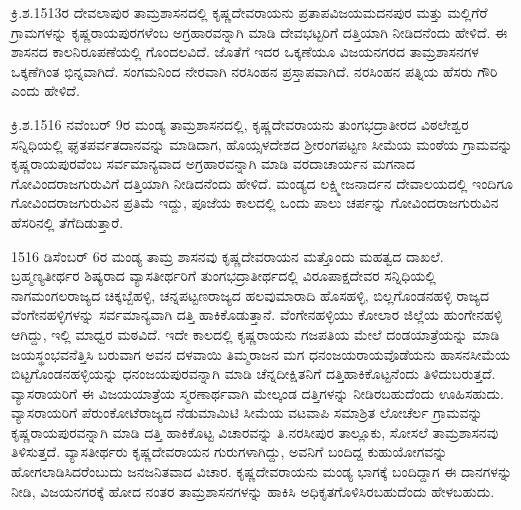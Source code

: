 ಕ್ರಿ.ಶ.1513ರ ದೇವಲಾಪುರ ತಾಮ್ರಶಾಸನದಲ್ಲಿ ಕೃಷ್ಣದೇವರಾಯನು ಪ್ರತಾಪವಿಜಯಮದನಪುರ ಮತ್ತು ಮಲ್ಲಿಗೆರೆ ಗ್ರಾಮಗಳನ್ನು ಕೃಷ್ಣರಾಯಪುರಗಳೆಂಬ ಅಗ್ರಹಾರವನ್ನಾಗಿ ಮಾಡಿ ದೇವಭಟ್ಟರಿಗೆ ದತ್ತಿಯಾಗಿ ನೀಡಿದನೆಂದು ಹೇಳಿದೆ. ಈ ಶಾಸನದ ಕಾಲನಿರೂಪಣೆಯಲ್ಲಿ ಗೊಂದಲವಿದೆ. ಜೊತೆಗೆ ಇದರ ಒಕ್ಕಣೆಯೂ ವಿಜಯನಗರದ ತಾಮ್ರಶಾಸನಗಳ ಒಕ್ಕಣೆಗಿಂತ ಭಿನ್ನವಾಗಿದೆ. ಸಂಗಮನಿಂದ ನೇರವಾಗಿ ನರಸಿಂಹನ ಪ್ರಸ್ತಾಪವಾಗಿದೆ. ನರಸಿಂಹನ ಪತ್ನಿಯ ಹೆಸರು ಗೌರಿ ಎಂದು ಹೇಳಿದೆ. 

ಕ್ರಿ.ಶ.1516 ನವೆಂಬರ್​ 9ರ ಮಂಡ್ಯ ತಾಮ್ರಶಾಸನದಲ್ಲಿ, ಕೃಷ್ಣದೇವರಾಯನು ತುಂಗಭದ್ರಾತೀರದ ವಿಠಲೇಶ್ವರ ಸನ್ನಿಧಿಯಲ್ಲಿ ಘೃತಪರ್ವತದಾನವನ್ನು ಮಾಡಿದಾಗ, ಹೊಯ್ಸಳದೇಶದ ಶ‍್ರೀರಂಗಪಟ್ಟಣ ಸೀಮೆಯ ಮಂಠೆಯ ಗ್ರಾಮವನ್ನು ಕೃಷ್ಣರಾಯಪುರವೆಂಬ ಸರ್ವಮಾನ್ಯವಾದ ಅಗ್ರಹಾರವನ್ನಾಗಿ ಮಾಡಿ ವರದಾಚಾರ್ಯನ ಮಗನಾದ ಗೋವಿಂದರಾಜಗುರುವಿಗೆ ದತ್ತಿಯಾಗಿ ನೀಡಿದನೆಂದು ಹೇಳಿದೆ. ಮಂಡ್ಯದ ಲಕ್ಷ್ಮೀಜನಾರ್ದನ ದೇವಾಲಯದಲ್ಲಿ ಇಂದಿಗೂ ಗೋವಿಂದರಾಜಗುರುವಿನ ಪ್ರತಿಮೆ ಇದ್ದು, ಪೂಜೆಯ ಕಾಲದಲ್ಲಿ ಒಂದು ಪಾಲು ಚರ್ಪನ್ನು ಗೋವಿಂದರಾಜಗುರುವಿನ ಹೆಸರಿನಲ್ಲಿ ತೆಗೆದಿಡುತ್ತಾರೆ.

1516 ಡಿಸೆಂಬರ್​ 6ರ ಮಂಡ್ಯ ತಾಮ್ರ ಶಾಸನವು ಕೃಷ್ಣದೇವರಾಯನ ಮತ್ತೊಂದು ಮಹತ್ವದ ದಾಖಲೆ. ಬ್ರಹ್ಮಣ್ಯತೀರ್ಥರ ಶಿಷ್ಯರಾದ ವ್ಯಾಸತೀರ್ಥರಿಗೆ ತುಂಗಭದ್ರಾತೀರ್ಥದಲ್ಲಿ ವಿರೂಪಾಕ್ಷದೇವರ ಸನ್ನಿಧಿಯಲ್ಲಿ ನಾಗಮಂಗಲರಾಜ್ಯದ ಚಿಕ್ಕಬ್ಬೆಹಳ್ಳಿ, ಚನ್ನಪಟ್ಟಣರಾಜ್ಯದ ಹಲವುಮಾರಾದಿ ಹೊಸಹಳ್ಳಿ, ಬಿಲ್ಲಗೊಂಡನಹಳ್ಳಿ ರಾಜ್ಯದ ವೆಂಗೇನಹಳ್ಳಿಗಳನ್ನು ಸರ್ವಮಾನ್ಯವಾಗಿ ದತ್ತಿ ಹಾಕಿಕೊಡುತ್ತಾನೆ. ವೆಂಗೇನಹಳ್ಳಿಯು ಕೋಲಾರ ಜಿಲ್ಲೆಯ ಹುಂಗೇನಹಳ್ಳಿ ಆಗಿದ್ದು, ಇಲ್ಲಿ ಮಾಧ್ವರ ಮಠವಿದೆ. ಇದೇ ಕಾಲದಲ್ಲಿ ಕೃಷ್ಣರಾಯನು ಗಜಪತಿಯ ಮೇಲೆ ದಂಡಯಾತ್ರೆಯನ್ನು ಮಾಡಿ ಜಯಸ್ಥಂಭವನೆತ್ತಿಸಿ ಬರುವಾಗ ಅವನ ದಳವಾಯಿ ತಿಮ್ಮರಾಜನ ಮಗ ಧನಂಜಯರಾಯವೊಡೆಯನು ಹಾಸನಸೀಮೆಯ ಬಿಟ್ಟಗೊಂಡನಹಳ್ಳಿಯನ್ನು ಧನಂಜಯಪುರವನ್ನಾಗಿ ಮಾಡಿ ಚೆನ್ನದೀಕ್ಷಿತನಿಗೆ ದತ್ತಿಹಾಕಿಕೊಟ್ಟನೆಂದು ತಿಳಿದುಬರುತ್ತದೆ. ವ್ಯಾಸರಾಯರಿಗೆ ಈ ವಿಜಯಯಾತ್ರೆಯ ಸ್ಮರಣಾರ್ಥವಾಗಿ ಮೇಲ್ಕಂಡ ದತ್ತಿಗಳನ್ನು ನೀಡಿರಬಹುದೆಂದು ಊಹಿಸಹುದು. ವ್ಯಾಸರಾಯರಿಗೆ ಪೆರುಂಕೋಟೆರಾಜ್ಯದ ನೆಡುಮಾಮಿಟಿ ಸೀಮೆಯ ವಟವಾಪಿ ಸಮಾಶ್ರಿತ ಲೋಚೆರ್ಲ ಗ್ರಾಮವನ್ನು ಕೃಷ್ಣರಾಯಪುರವನ್ನಾಗಿ ಮಾಡಿ ದತ್ತಿ ಹಾಕಿಕೊಟ್ಟ ವಿಚಾರವನ್ನು ತಿ.ನರಸೀಪುರ ತಾಲ್ಲೂಕು, ಸೋಸಲೆ ತಾಮ್ರಶಾಸನವು ತಿಳಿಸುತ್ತದೆ. ವ್ಯಾಸತೀರ್ಥರು ಕೃಷ್ಣದೇವರಾಯನ ಗುರುಗಳಾಗಿದ್ದು, ಅವನಿಗೆ ಬಂದಿದ್ದ ಕುಹುಯೋಗವನ್ನು ಹೋಗಲಾಡಿಸಿದರೆಂಬುದು ಜನಜನಿತವಾದ ವಿಚಾರ. ಕೃಷ್ಣದೇವರಾಯನು ಮಂಡ್ಯ ಭಾಗಕ್ಕೆ ಬಂದಿದ್ದಾಗ ಈ ದಾನಗಳನ್ನು ನೀಡಿ, ವಿಜಯನಗರಕ್ಕೆ ಹೋದ ನಂತರ ತಾಮ್ರಶಾಸನಗಳನ್ನು ಹಾಕಿಸಿ ಅಧಿಕೃತಗೊಳಿಸಿರ\-ಬಹುದೆಂದು ಹೇಳಬಹುದು.

